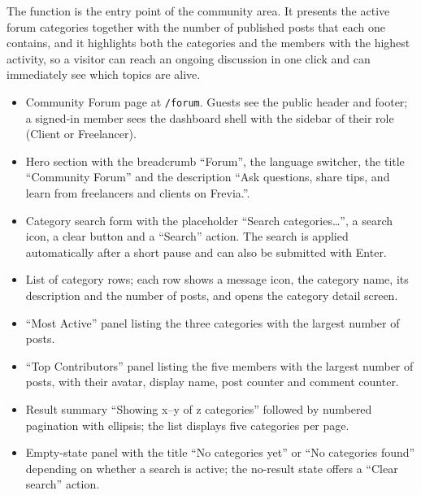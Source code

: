 \noindent The function is the entry point of the community area. It presents the active forum
categories together with the number of published posts that each one contains, and it
highlights both the categories and the members with the highest activity, so a visitor can
reach an ongoing discussion in one click and can immediately see which topics are alive.

\begin{itemize}[leftmargin=1.6em,topsep=3pt,itemsep=2pt,parsep=0pt,label=$\bullet$]
      \item Community Forum page at \texttt{/forum}. Guests see the public header and
            footer; a signed-in member sees the dashboard shell with the sidebar of their
            role (Client or Freelancer).
      \item Hero section with the breadcrumb ``Forum'', the language switcher, the title
            ``Community Forum'' and the description ``Ask questions, share tips, and learn
            from freelancers and clients on Frevia.''.
      \item Category search form with the placeholder ``Search categories\ldots'', a search
            icon, a clear button and a ``Search'' action. The search is applied
            automatically after a short pause and can also be submitted with Enter.
      \item List of category rows; each row shows a message icon, the category name, its
            description and the number of posts, and opens the category detail screen.
      \item ``Most Active'' panel listing the three categories with the largest number of posts.
      \item ``Top Contributors'' panel listing the five members with the largest number of posts,
            with their avatar, display name, post counter and comment counter.
      \item Result summary ``Showing x--y of z categories'' followed by numbered pagination
            with ellipsis; the list displays five categories per page.
      \item Empty-state panel with the title ``No categories yet'' or ``No categories
            found'' depending on whether a search is active; the no-result state offers a
            ``Clear search'' action.
\end{itemize}

